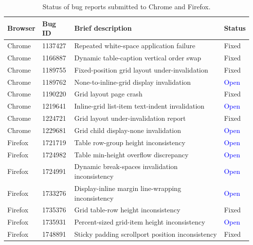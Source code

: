 \begin{table}[t]
    \centering
    \caption{Status of bug reports submitted to Chrome and Firefox.}
    \label{tab:rq3-reported-bugs}
    \scriptsize
    \setlength{\tabcolsep}{2pt}
    \begin{tabular}{l|l|p{}|l}
        \toprule
        \textbf{Browser} & \textbf{Bug ID} & \textbf{Brief description} & \textbf{Status} \\
        \midrule
        Chrome & 1137427 & Repeated white-space application failure & \textcolor{green!50!black}{Fixed} \\
        Chrome & 1166887 & Dynamic table-caption vertical order swap & \textcolor{green!50!black}{Fixed} \\
        Chrome & 1189755 & Fixed-position grid layout under-invalidation & \textcolor{green!50!black}{Fixed} \\
        Chrome & 1189762 & None-to-inline-grid display invalidation & \textcolor{blue}{Open} \\
        Chrome & 1190220 & Grid layout page crash & \textcolor{green!50!black}{Fixed} \\
        Chrome & 1219641 & Inline-grid list-item text-indent invalidation & \textcolor{blue}{Open} \\
        Chrome & 1224721 & Grid layout under-invalidation report & \textcolor{green!50!black}{Fixed} \\
        Chrome & 1229681 & Grid child display-none invalidation & \textcolor{blue}{Open} \\
        \midrule
        Firefox & 1721719 & Table row-group height inconsistency & \textcolor{blue}{Open} \\
        Firefox & 1724982 & Table min-height overflow discrepancy & \textcolor{blue}{Open} \\
        Firefox & 1724991 & Dynamic break-spaces invalidation inconsistency & \textcolor{blue}{Open} \\
        Firefox & 1733276 & Display-inline margin line-wrapping inconsistency & \textcolor{blue}{Open} \\
        Firefox & 1735376 & Grid table-row height inconsistency & \textcolor{green!50!black}{Fixed} \\
        Firefox & 1735931 & Percent-sized grid-item height inconsistency & \textcolor{blue}{Open} \\
        Firefox & 1748891 & Sticky padding scrollport position inconsistency & \textcolor{green!50!black}{Fixed} \\
        \bottomrule
    \end{tabular}
\end{table}

